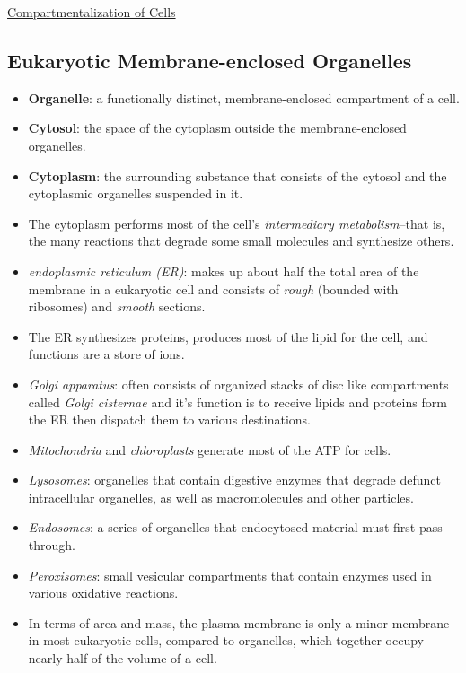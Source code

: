 \documentclass[12pt,letterpaper]{article}
\begin{document}
\hypertarget{12.1}{}
\begin{secbox}{\hyperlink{12}{Compartmentalization of Cells}}{
    \hypertarget{12.1.1}{\subsection*{Eukaryotic Membrane-enclosed Organelles}}
    \begin{itemize}
        \item \textbf{Organelle}: a functionally distinct, membrane-enclosed compartment of a cell.
        \item \textbf{Cytosol}: the space of the cytoplasm outside the membrane-enclosed organelles.
        \item \textbf{Cytoplasm}: the surrounding substance that consists of the cytosol and the cytoplasmic organelles suspended in it.
        \item The cytoplasm performs most of the cell's \textit{intermediary metabolism}--that is, the many reactions that degrade some small molecules and synthesize others.
        \item \textit{endoplasmic reticulum (ER)}: makes up about half the total area of the membrane in a eukaryotic cell and consists of \textit{rough} (bounded with ribosomes) and \textit{smooth} sections. 
        \item The ER synthesizes proteins, produces most of the lipid for the cell, and functions are a store of  ions. 
        \item \textit{Golgi apparatus}: often consists of organized stacks of disc like compartments called \textit{Golgi cisternae} and it's function is to receive lipids and proteins form the ER then dispatch them to various destinations. 
        \item \textit{Mitochondria} and \textit{chloroplasts} generate most of the ATP for cells. 
        \item \textit{Lysosomes}: organelles that contain digestive enzymes that degrade defunct intracellular organelles, as well as macromolecules and other particles.
        \item \textit{Endosomes}: a series of organelles that endocytosed material must first pass through.
        \item \textit{Peroxisomes}: small vesicular compartments that contain enzymes used in various oxidative reactions.
        \item In terms of area and mass, the plasma membrane is only a minor membrane in most eukaryotic cells, compared to organelles, which together occupy nearly half of the volume of a cell.\par 

\end{itemize}}
\end{secbox}
\end{document}
